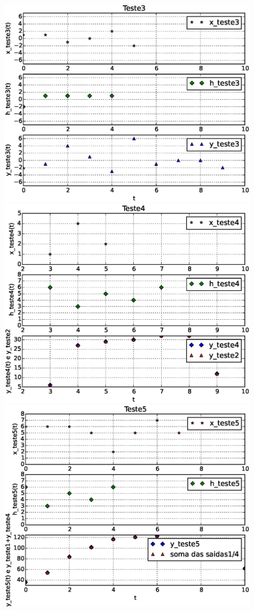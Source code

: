 \documentclass[dvipdfm, a4paper, 11pt]{report}
\begin{document}
{\includegraphics[scale = 0.5]{Teste3.eps}\\
\includegraphics[scale = 0.5]{Teste4.eps}\\
\includegraphics[scale = 0.5]{Teste5.eps}\\
}
\end{document}
